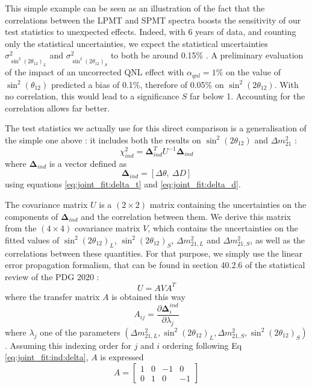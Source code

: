 \documentclass[../main.tex]{subfiles}
\begin{document}
This simple example can be seen as an illustration of the fact that the correlations between the LPMT and SPMT spectra boosts the sensitivity of our test statistics to unexpected effects. Indeed, with 6 years of data, and counting only the statistical uncertainties, we expect the statistical uncertainties $\sigma^2_{\sin^2(2\theta_{12})_L}$ and $\sigma^2_{\sin^2(2\theta_{12})_S}$ to both be around 0.15\% \cites{juno_collaboration_sub-percent_2022}. A preliminary evaluation \cite{cabrera_multi-calorimetry_2023} of the impact of an uncorrected QNL effect with $\alpha_{qnl} = 1\%$ on the value of $\sin^2(\theta_{12})$ predicted a bias of 0.1\%, therefore of 0.05\% on $\sin^2(2\theta_{12})$. With no correlation, this would lead to a significance $S$ far below 1. Accounting for the correlation allows far better.

The test statistics we actually use for this direct comparison is a generalisation of the simple one above : it includes both the results on $\sin^2(2\theta_{12})$ and $\Delta m^2_{21}$ :
\begin{equation}
  \chi^2_{ind} = \bm{\Delta}_{ind}^T U^{-1} \bm{\Delta}_{ind}
\end{equation}
where $\bm{\Delta}_{ind}$ is a vector defined as
\begin{equation}
  \label{eq:joint_fit:ind:delta}
  \bm{\Delta}_{ind} = [ \Delta \theta, ~ \Delta D ]
\end{equation}
using equations \ref{eq:joint_fit:delta_t} and \ref{eq:joint_fit:delta_d}.

The covariance matrix $U$ is a $(2 \times 2)$ matrix containing the uncertainties on the components of $\bm{\Delta}_{ind}$ and the correlation between them. We derive this matrix from the $(4 \times 4)$ covariance matrix $V$, which contains the uncertainties on the fitted values of $\sin^2(2\theta_{12})_L$, $\sin^2(2\theta_{12})_S$, $\Delta m^2_{21,L}$ and $\Delta m^2_{21,S}$, as well as the correlations between these quantities.
For that purpose, we simply use the linear error propagation formalism, that can be found in section 40.2.6 of the statistical review of the PDG 2020 \cite{particle_data_group_review_2020} :
\begin{equation}
  U = A V A^T
\end{equation}
where the transfer matrix $A$ is obtained this way
\begin{equation}
  A_{ij} = \frac{\partial \bm{\Delta}^{ind}_i}{\partial \lambda_j}
\end{equation}
where $\lambda_j$ one of the parameters $(\Delta m^2_{21,L}, \sin^2(2\theta_{12})_L, \Delta m^2_{21,S}, \sin^2(2\theta_{12})_S)$. Assuming this indexing order for $j$ and $i$ ordering following Eq \ref{eq:joint_fit:ind:delta}, $A$ is expressed
\begin{equation}
  A = \begin{bmatrix}
    1 & 0 & -1 & 0\\
    0 & 1 & 0 & -1
    \end{bmatrix}
\end{equation}
\end{document}
